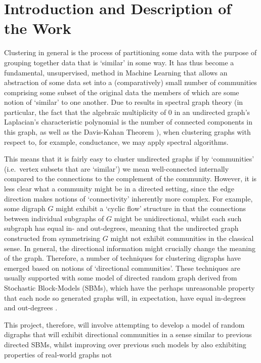 \documentclass[a4paper,12pt]{article}
\begin{document}
\section*{Introduction and Description of the Work}
	Clustering in general is the process of partitioning some data with the purpose of 
	grouping together data that is `similar' in some way. It has thus become a fundamental, 
	unsupervised, method in Machine Learning that allows an abstraction of some data set into 
	a (comparatively) small number of communities comprising some subset of the original data 
	the members of which are some notion of `similar' to one another. Due to results in 
	spectral graph theory (in particular, the fact that the algebra\"ic multiplicity of 0 
	in an undirected graph's Laplacian's characteristic polynomial is the number of connected 
	components in this graph, as well as the Davis-Kahan Theorem \cite{daviskahan}), 
	when clustering graphs with respect to, for example, conductance, we may apply spectral 
	algorithms. \par
	This means that it is fairly easy to cluster undirected graphs if by `communities' (i.e.\ 
	vertex subsets that are `similar') we mean well-connected internally compared to the 
	connections to the complement of the community. 
	However, it is less clear what a community might be in a directed setting, since the edge 
	direction makes notions of `connectivity' inherently more complex. For example, some 
	digraph $G$ might exhibit a `cyclic flow'
	structure in that the connections between individual subgraphs of $G$ might be 
	unidirectional, whilst each such subgraph has equal in- and out-degrees, meaning that the 
	undirected graph constructed from symmetrising $G$ might not exhibit communities in the 
	classical sense. In general, the directional information might crucially change the 
	meaning of the graph. Therefore, a number of techniques for clustering digraphs have 
	emerged based on notions of `directional communities'. These techniques are usually 
	supported with some model of directed random graph derived from Stochastic Block-Models 
	(SBMs), which have the perhaps unreasonable property that each node so generated graphs 
	will, in expectation, have equal in-degrees and out-degrees \cite{lucapaper, disimpaper}. \par
	This project, therefore, will involve attempting to develop a model of random digraphs that will 
	exhibit directional communities in a sense similar to previous directed SBMs, whilst 
	improving over previous such models by also exhibiting properties of real-world graphs not 
\end{document}
